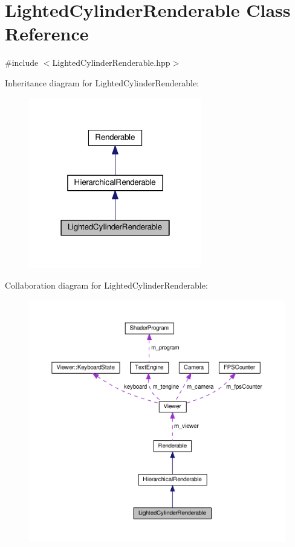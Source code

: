 \hypertarget{classLightedCylinderRenderable}{\section{Lighted\+Cylinder\+Renderable Class Reference}
\label{classLightedCylinderRenderable}
}


{\ttfamily \#include $<$Lighted\+Cylinder\+Renderable.\+hpp$>$}



Inheritance diagram for Lighted\+Cylinder\+Renderable\+:\nopagebreak
\begin{figure}[H]
\begin{center}
\leavevmode
\includegraphics[width=214pt]{classLightedCylinderRenderable__inherit__graph}
\end{center}
\end{figure}


Collaboration diagram for Lighted\+Cylinder\+Renderable\+:\nopagebreak
\begin{figure}[H]
\begin{center}
\leavevmode
\includegraphics[width=350pt]{classLightedCylinderRenderable__coll__graph}
\end{center}
\end{figure}
